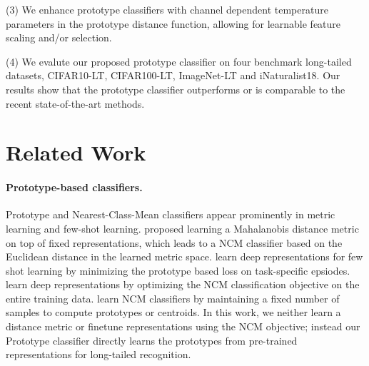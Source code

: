 \documentclass{article}
\begin{document}
(3) We enhance prototype classifiers with channel dependent temperature parameters in the prototype distance function, allowing for learnable feature scaling and/or selection. 

(4) We evalute our proposed prototype classifier on four benchmark long-tailed datasets, CIFAR10-LT, CIFAR100-LT, ImageNet-LT and iNaturalist18. Our results show that the prototype classifier outperforms or is comparable to the recent state-of-the-art methods. 

\section{Related Work}
\label{Related Work}

\paragraph{Prototype-based classifiers.} Prototype and Nearest-Class-Mean classifiers appear prominently in metric learning and few-shot learning. \cite{mensink2013distance} proposed learning a Mahalanobis distance metric on top of fixed representations, which leads to a NCM classifier based on the Euclidean distance in the learned metric space. \cite{snell2017prototypical} learn deep representations for few shot learning by minimizing the prototype based loss on task-specific epsiodes. \cite{guerriero2018deepncm} learn deep representations by optimizing the NCM classification objective on the entire training data. \cite{rebuffi2017icarl} learn NCM classifiers by maintaining a fixed number of samples to compute prototypes or centroids. In this work, we neither learn a distance metric or finetune representations using the NCM objective; instead our Prototype classifier directly learns the prototypes from pre-trained representations for long-tailed recognition.
\end{document}
